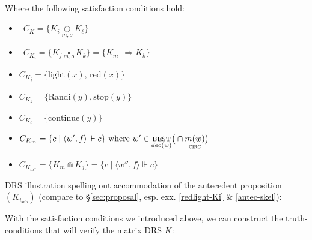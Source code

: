 \-\\\vspace{1pt}
Where the following satisfaction conditions hold:
\begin{itemize}
  	\item \, $C_K = \{K_i\underset{m,o}{\ominus} K_\ell\}$
	\item \, $C_{K_i} =\{ K_j\, \underset{m,o}{\square}\, K_k\} = \{K_{m^+}\Rightarrow K_k	\}$
	\item  $C_{K_j} = \{\text{light}(x),\,\text{red}(x)\}$
	\item  $C_{K_k} = \{\text{Randi}(y), \text{stop}(y)\}$
	\item  $C_{K_\ell} = \{\text{continue}(y)\}$
	\item  $C_{K_m} = \{c\mid\langle w',f\rangle\Vdash c\} \text{ where } w'\in\underset{deo(w)}{\textsc{best}}\big(\cap\underset{\textsc{circ}}{m(w)}\big)$
	\item  $C_{K_{m^+}} = \{K_m\Cap K_j\} = \{c\mid\langle w''\!,f\rangle\Vdash c\} $
\end{itemize}
\a DRS illustration spelling out accommodation of the antecedent proposition $ (K_{i_{\text{sub}}}) $ (compare to \S \ref{sec:proposal}, esp. exx. \ref{redlight-Ki} \& \ref{antec-skel}):\\
\xe%


With the satisfaction conditions we introduced above, we can construct the truth-conditions that will verify the matrix DRS $ K $: 

